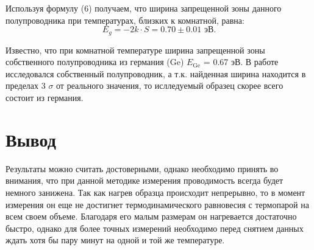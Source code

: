 \documentclass[a4paper, 14pt]{extarticle}%
\begin{document}
Используя формулу (6) получаем, что ширина запрещенной зоны данного полупроводника при температурах, близких к комнатной, равна:
\[E_g = -2k\cdot S = 0.70 \pm 0.01 \text{ эВ}.\]

Известно, что при комнатной температуре ширина запрещенной зоны собственного полупроводника из германия (Ge) $E_{\text{Ge}}$ = 0.67 эВ. В работе исследовался собственный полупроводник, а т.к. найденная ширина находится в пределах 3 $\sigma$ от реального значения, то ислледуемый образец скорее всего состоит из германия. 
\newpage
\section*{Вывод}
Результаты можно считать достоверными, однако необходимо принять во внимания, что при данной методике измерения проводимость всегда будет немного занижена. Так как нагрев образца происходит непрерывно, то в момент измерения он еще не достигнет термодинамического равновесия с термопарой на всем своем объеме. Благодаря его малым размерам он нагревается достаточно быстро, однако для более точных измерений необходимо перед снятием данных ждать хотя бы пару минут на одной и той же температуре.
\end{document}
